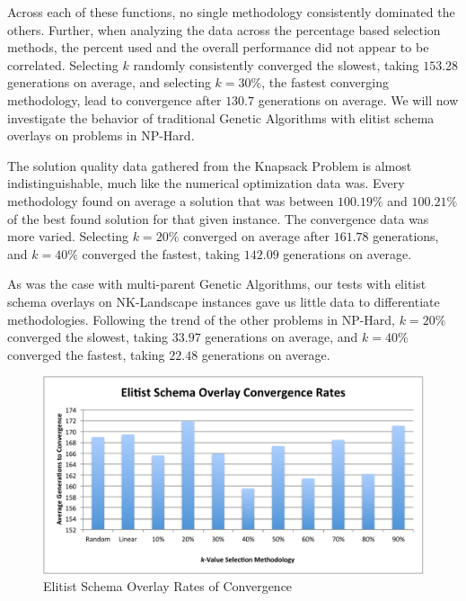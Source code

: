 Across each of these functions, no single methodology consistently dominated the others. Further, when analyzing the data across the percentage based selection methods, the percent used and the overall performance did not appear to be correlated. Selecting $k$ randomly consistently converged the slowest, taking $153.28$ generations on average, and selecting $k = 30\%$, the fastest converging methodology, lead to convergence after $130.7$ generations on average. We will now investigate the behavior of traditional Genetic Algorithms with elitist schema overlays on problems in NP-Hard.

%
%

The solution quality data gathered from the Knapsack Problem is almost indistinguishable, much like the numerical optimization data was. Every methodology found on average a solution that was between $100.19\%$ and $100.21\%$ of the best found solution for that given instance. The convergence data was more varied. Selecting $k = 20\%$ converged on average after $161.78$ generations, and $k = 40\%$ converged the fastest, taking $142.09$ generations on average. 

%
%

%
%

As was the case with multi-parent Genetic Algorithms, our tests with elitist schema overlays on NK-Landscape instances gave us little data to differentiate methodologies. Following the trend of the other problems in NP-Hard, $k = 20\%$ converged the slowest, taking $33.97$ generations on average, and $k = 40\%$ converged the fastest, taking $22.48$ generations on average. 

\begin{figure}[htbp!]
\centering
\includegraphics[scale=0.70]{charts/Convergence.pdf}
\caption{Elitist Schema Overlay Rates of Convergence}
\label{fig:eso_convergence}
\end{figure}

